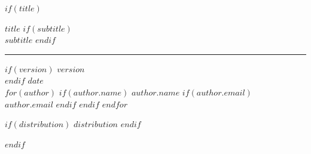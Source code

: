 \documentclass[
    $if(fontsize)$$fontsize$$else$10pt$endif$,
    $if(papersize)$$papersize$$else$letterpaper$endif$,
    titlepage,
    oneside,
    openright,
    $if(draft)$draft$else$final$endif$,
    article]{memoir}
\begin{document}
%
$if(title)$
    \ifpdf
    \fi
    \newlength{\centeroffset}
    \thispagestyle{empty}
    \vspace*{1.5in}
    \begin{flushleft}
        {
            {\fontsize{20pt}{24pt}$title$}
            $if(subtitle)$
                {\\\fontsize{18pt}{21.6pt}$subtitle$}
            $endif$
        }
        \noindent\rule[-1.2pt]{\textwidth}{0.1pt}

        $if(version)$
            {\fontsize{12pt}{14.4pt}
                \space $version$\\[0.05in]
            }
        $endif$
        {\fontsize{12pt}{14.4pt}$date$}\\[0.05in]


        \vspace*{2.5in}
        $for(author)$
            $if(author.name)$
                {\fontsize{12pt}{14.4pt}$author.name$}
                $if(author.email)$
                    {\\[0.05in]\fontsize{12pt}{14.4pt}$author.email$}
                $endif$
            $endif$
        $endfor$

        \vspace*{\fill}
        $if(distribution)$
            {\fontsize{11pt}{13.2pt}$distribution$}
        $endif$
    \end{flushleft}
$endif$

\frontmatter

\end{document}
